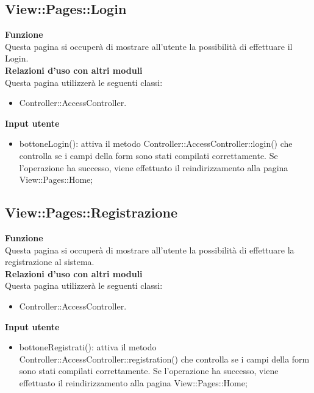 {\subsection{View::Pages::Login}{
	\textbf{Funzione}\\
		\indent Questa pagina si occuperà di mostrare all'utente la possibilità di effettuare il Login.\\
	\textbf{Relazioni d'uso con altri moduli}\\
		\indent Questa pagina utilizzerà le seguenti classi:
	\begin{itemize}
		\item Controller::AccessController.
	\end{itemize}
	\textbf{Input utente}
		\begin{itemize}
		\item bottoneLogin(): attiva il metodo Controller::AccessController::login() che controlla se i campi della form sono stati compilati correttamente. Se l'operazione ha successo, viene effettuato il reindirizzamento alla pagina View::Pages::Home;
	\end{itemize}
	}
	\subsection{View::Pages::Registrazione}{
	\textbf{Funzione}\\
		\indent Questa pagina si occuperà di mostrare all'utente la possibilità di effettuare la registrazione al sistema.\\
	\textbf{Relazioni d'uso con altri moduli}\\
		\indent Questa pagina utilizzerà le seguenti classi:
	\begin{itemize}
		\item Controller::AccessController.
	\end{itemize}
	\textbf{Input utente}
		\begin{itemize}
		\item bottoneRegistrati(): attiva il metodo Controller::AccessController::registration() che controlla se i campi della form sono stati compilati correttamente. Se l'operazione ha successo, viene effettuato il reindirizzamento alla pagina View::Pages::Home;
	\end{itemize}
	}
}
